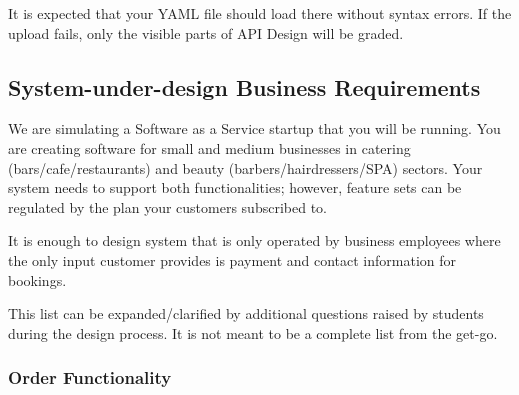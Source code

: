 \documentclass[]{VUMIFTemplateClass}
\begin{document}
It is expected that your YAML file should load there without syntax errors. If the upload fails, only the visible parts of API Design will be graded.

\subsection*{System-under-design Business Requirements}

We are simulating a Software as a Service startup that you will be running. You are creating software for small and medium businesses in catering (bars/cafe/restaurants) and beauty (barbers/hairdressers/SPA) sectors. Your system needs to support both functionalities; however, feature sets can be regulated by the plan your customers subscribed to.

It is enough to design system that is only operated by business employees where the only input customer provides is payment and contact information for bookings.

This list can be expanded/clarified by additional questions raised by students during the design process. It is not meant to be a complete list from the get-go.

\subsubsection*{Order Functionality}
\end{document}
